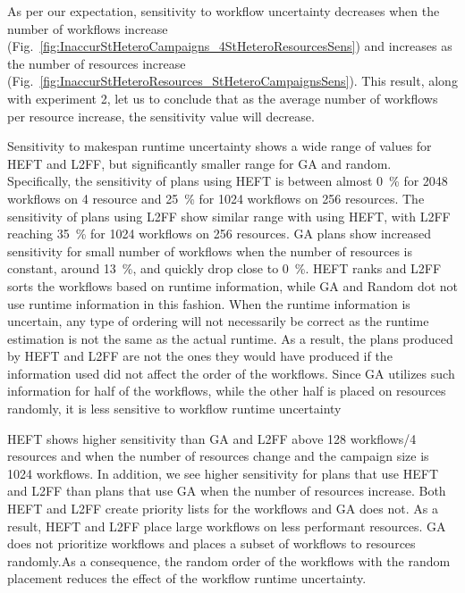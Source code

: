 As per our expectation, sensitivity to workflow uncertainty decreases when the 
number of workflows increase 
(Fig.~\ref{fig:InaccurStHeteroCampaigns_4StHeteroResourcesSens}) and increases 
as the number of resources increase 
(Fig.~\ref{fig:InaccurStHeteroResources_StHeteroCampaignsSens}). This result, 
along with experiment 2, let us to conclude that as the average number of 
workflows per resource increase, the sensitivity value will decrease.

Sensitivity to makespan runtime uncertainty shows a wide range of values for 
HEFT and L2FF, but significantly smaller range for GA and random. 
Specifically, the sensitivity of plans using HEFT is between almost 0~\% for 
2048 workflows on 4 resource and 25~\% for 1024 workflows on 256 resources. 
The sensitivity of plans using L2FF show similar range with using HEFT, with 
L2FF reaching 35~\% for 1024 workflows on 256 resources. GA plans show 
increased sensitivity for small number of workflows when the number of 
resources is constant, around 13~\%, and quickly drop close to 0~\%. HEFT 
ranks and L2FF sorts the workflows based on runtime information, while GA and 
Random dot not use runtime information in this fashion. When the runtime 
information is uncertain, any type of ordering will not necessarily be correct 
as the runtime estimation is not the same as the actual runtime. As a result, 
the plans produced by HEFT and L2FF are not the ones they would have produced 
if the information used did not affect the order of the workflows. Since GA 
utilizes such information for half of the workflows, while the other half is 
placed on resources randomly, it is less sensitive to workflow runtime 
uncertainty

HEFT shows higher sensitivity than GA and L2FF above 128 workflows/4 resources 
and when the number of resources change and the campaign size is 1024 
workflows. In addition, we see higher sensitivity for plans that use HEFT and 
L2FF than plans that use GA when the number of resources increase. Both HEFT 
and L2FF create priority lists for the workflows and GA does not. As a result, 
HEFT and L2FF place large workflows on less performant resources. GA does not 
prioritize workflows and places a subset of workflows to resources randomly.As 
a consequence, the random order of the workflows with the random placement 
reduces the effect of the workflow runtime uncertainty.

